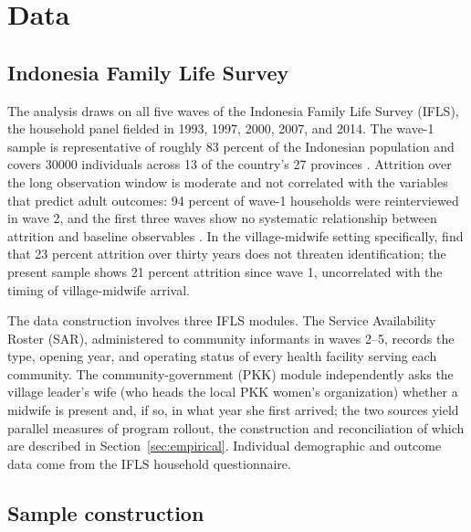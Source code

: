 
\section{Data} \label{sec:data}

\subsection{Indonesia Family Life Survey}

The analysis draws on all five waves of the Indonesia Family Life Survey (IFLS), the household panel fielded in 1993, 1997, 2000, 2007, and 2014. The wave-1 sample is representative of roughly 83 percent of the Indonesian population and covers \num{30000} individuals across 13 of the country's 27 provinces \autocite{strauss2016}. Attrition over the long observation window is moderate and not correlated with the variables that predict adult outcomes: 94 percent of wave-1 households were reinterviewed in wave 2, and the first three waves show no systematic relationship between attrition and baseline observables \autocite{thomas2000}. In the village-midwife setting specifically, \textcite{ahsan2021} find that 23 percent attrition over thirty years does not threaten identification; the present sample shows 21 percent attrition since wave 1, uncorrelated with the timing of village-midwife arrival.

The data construction involves three IFLS modules. The Service Availability Roster (SAR), administered to community informants in waves 2--5, records the type, opening year, and operating status of every health facility serving each community. The community-government (PKK) module independently asks the village leader's wife (who heads the local PKK women's organization) whether a midwife is present and, if so, in what year she first arrived; the two sources yield parallel measures of program rollout, the construction and reconciliation of which are described in Section~\ref{sec:empirical}. Individual demographic and outcome data come from the IFLS household questionnaire.

\subsection{Sample construction}

